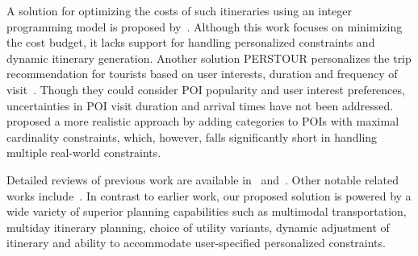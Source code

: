 A solution for optimizing the costs of such itineraries using an integer programming model is proposed by~\cite{rambha2024optimized}. Although this work focuses on minimizing the cost budget, it lacks support for handling personalized constraints and dynamic itinerary generation. Another solution PERSTOUR personalizes the trip recommendation for tourists based on user interests, duration and frequency of visit~\cite{lim2018personalized}. Though they could consider POI popularity and user interest preferences, uncertainties in POI visit duration and arrival times have not been addressed. \cite{bolzoni2014efficient} proposed a more realistic approach by adding categories to POIs with maximal cardinality constraints, which, however, falls significantly short in handling multiple real-world constraints.

Detailed reviews of previous work are available in~\cite{gavalas2014survey} and~\cite{sylejmani2011survey}.
Other notable related works include~\cite{zheng2021novel,yu2017mining,jiaoman2018travel,sylejmani2017planning,zografos2008algorithms,rani2018development,yu2014optimal,arora2024itinerary}. In contrast to earlier work, our proposed \trip solution is powered by a wide variety of superior planning capabilities such as multimodal transportation, multiday itinerary planning, choice of utility variants, dynamic adjustment of itinerary and ability to accommodate user-specified personalized constraints.

